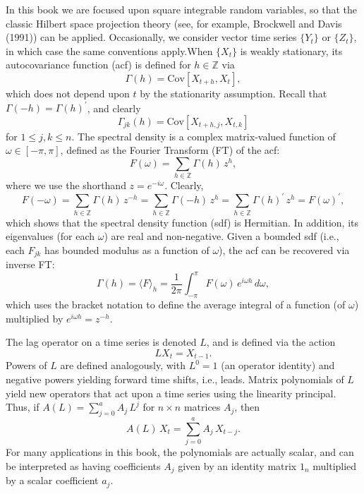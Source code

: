 \documentclass[a4paper]{book}
\def\ZZ{\mathbb Z}
\begin{document}
 In this book we are focused upon square integrable random variables,
 so that the classic Hilbert space projection theory (see, for example,
 Brockwell and Davis (1991)) can be applied.   Occasionally, we consider 
  vector time series $\{ Y_t \}$ or $\{ Z_t \}$, in which case the 
 same conventions apply.When $\{ X_t \}$ is 
 weakly stationary, its autocovariance function (acf)
 is defined for $h \in \ZZ$  via 
\[
   \Gamma (h) = \mbox{Cov} [ X_{t+h}, X_t ],
\]
 which does not depend upon $t$ by the stationarity assumption.  Recall
 that $\Gamma (-h) = { \Gamma (h) }^{\prime}$, and clearly
\[
   \Gamma_{jk} (h) = \mbox{Cov} [ X_{t+h,j}, X_{t,k} ]
\]
 for $1 \leq j,k \leq n$. The spectral density is a complex matrix-valued
 function of $\omega \in [-\pi, \pi]$, defined as the 
 Fourier Transform (FT) of the acf:
\[
   F (\omega) = \sum_{h \in \ZZ} \Gamma (h) \, z^h,
\]
 where we use the shorthand $z = e^{-i \omega}$.  Clearly,
\[
    F(-\omega) = 
   \sum_{h \in \ZZ} \Gamma (h) \, z^{-h} 
   = \sum_{h \in \ZZ} \Gamma (-h) \, z^h = 
  \sum_{h \in \ZZ} { \Gamma (h) }^{\prime} \, z^h = { F (\omega) }^{\prime},
\]
 which shows that the spectral density function (sdf) is Hermitian.
  In addition, its eigenvalues (for each $\omega$) are real and non-negative.
  Given a bounded sdf (i.e., each $F_{jk} $ has bounded modulus as a function
 of $\omega$), the acf can be recovered via inverse FT:
\begin{equation}
 \label{eq:spec2acf}
  \Gamma (h) = { \langle F  \rangle }_h
  =  \frac{1}{2 \pi} \int_{-\pi}^{\pi} F(\omega) \, e^{i \omega h}
  \, d\omega,
\end{equation}
 which uses the bracket notation to define the average integral of a 
 function (of $\omega$) multiplied by $e^{i \omega h} = z^{-h}$.

 The lag operator on a time series is denoted $L$, and is defined via
 the action
\[
  L X_t = X_{t-1}.
\]
  Powers  of $L$ are defined analogously, with $L^0 = 1$ (an operator
 identity) and negative powers yielding forward time shifts, i.e., leads.
 Matrix polynomials of $L$ yield new operators that act upon a time series
 using the linearity principal.  Thus, if $A(L) = \sum_{j=0}^a A_j \, L^j$
 for $n \times n$ matrices $A_j$, then
\[
  A(L) \, X_t = \sum_{j=0}^a A_j \, X_{t-j}.
\] 
  For many applications in this book, the polynomials are actually scalar,
 and can be interpreted as having coefficients $A_j$ given by an  
 identity matrix $1_n$ multiplied by a scalar coefficient $a_j$.
 
\end{document}
